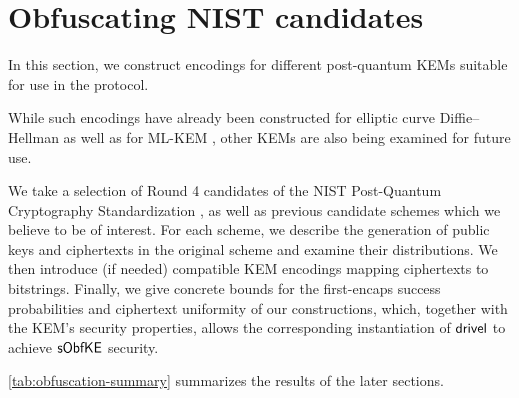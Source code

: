 \chapter{Obfuscating NIST candidates}\label{ch:obfuscation}

In this section, we construct encodings for different post-quantum KEMs suitable for use in the \drivel protocol.

While such encodings have already been constructed for elliptic curve Diffie–Hellman \cite{EC:vAhHop04,tor-dev-udh,USENIX:WWGH11,CCS:BHKL13,FC:Tibouchi14} as well as for ML-KEM \cite{CCS:GunSteVei24}, other KEMs are also being examined for future use.

We take a selection of Round 4 candidates of the NIST Post-Quantum Cryptography Standardization \cite{nist-standardization}, as well as previous candidate schemes which we believe to be of interest.
For each scheme, we describe the generation of public keys and ciphertexts in the original scheme and examine their distributions. We then introduce (if needed) compatible KEM encodings mapping ciphertexts to bitstrings. Finally, we give concrete bounds for the first-encaps success probabilities and ciphertext uniformity of our constructions, which, together with the KEM's security properties, allows the corresponding instantiation of $\textsf{drivel}$ to achieve $\mathsf{sObfKE}$ security.

\cref{tab:obfuscation-summary} summarizes the results of the later sections.

